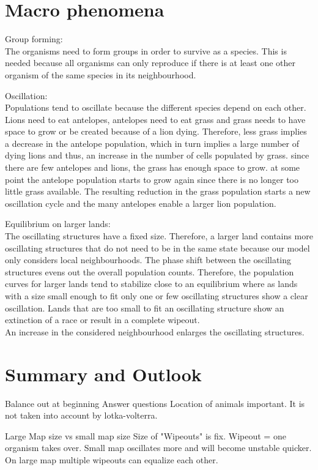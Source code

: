 \documentclass[11pt]{article}
\begin{document}
\section{Macro phenomena}

Group forming:\\
The organisms need to form groups in order to survive as a species. This is needed because all organisms can only reproduce if there is at least one other organism of the same species in its neighbourhood.

Oscillation:\\
Populations tend to oscillate because the different species depend on each other. Lions need to eat antelopes, antelopes need to eat grass and grass needs to have space to grow or be created because of a lion dying. Therefore, less grass implies a decrease in the antelope population, which in turn implies a large number of dying lions and thus, an increase in the number of cells populated by grass. since there are few antelopes and lions, the grass has enough space to grow. at some point the antelope population starts to grow again since there is no longer too little grass available. The resulting reduction in the grass population starts a new oscillation cycle and the many antelopes enable a larger lion population.

Equilibrium on larger lands:\\
The oscillating structures have a fixed size. Therefore, a larger land contains more oscillating structures that do not need to be in the same state because our model only considers local neighbourhoods. The phase shift between the oscillating structures evens out the overall population counts. Therefore, the population curves for larger lands tend to stabilize close to an equilibrium where as lands with a size small enough to fit only one or few oscillating structures show a clear oscillation. Lands that are too small to fit an oscillating structure show an extinction of a race or result in a complete wipeout.\\
An increase in the considered neighbourhood enlarges the oscillating structures.
\section{Summary and Outlook}
Balance out at beginning
Answer questions
Location of animals important. It is not taken into account by lotka-volterra.

Large Map size vs small map size
Size of "Wipeouts" is fix. Wipeout = one organism takes over. Small map oscillates more and will become unstable quicker. On large map multiple wipeouts can equalize each other.
\end{document}
